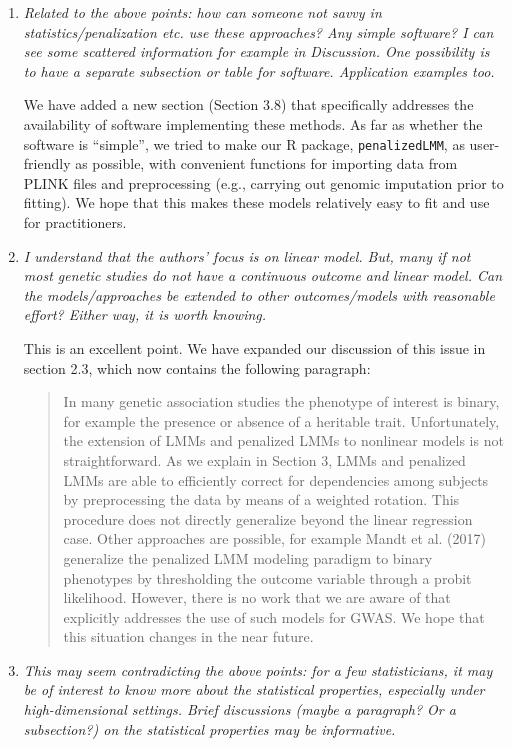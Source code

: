 \documentclass{article}
\begin{document}
\begin{enumerate}
\item \emph{Related to the above points: how can someone not savvy in statistics/penalization etc. use these approaches? Any simple software? I can see some scattered information for example in Discussion. One possibility is to have a separate subsection or table for software. Application examples too.}

  We have added a new section (Section 3.8) that specifically addresses the availability of software implementing these methods.  As far as whether the software is ``simple'', we tried to make our R package, \texttt{penalizedLMM}, as user-friendly as possible, with convenient functions for importing data from PLINK files and preprocessing (e.g., carrying out genomic imputation prior to fitting).  We hope that this makes these models relatively easy to fit and use for practitioners.

\item \emph{I understand that the authors’ focus is on linear model. But, many if not most genetic studies do not have a continuous outcome and linear model. Can the models/approaches be extended to other outcomes/models with reasonable effort? Either way, it is worth knowing.}

  This is an excellent point.  We have expanded our discussion of this issue in section 2.3, which now contains the following paragraph:

  \begin{quote}
    In many genetic association studies the phenotype of interest is binary, for example the presence or absence of a heritable trait. Unfortunately, the extension of LMMs and penalized LMMs to nonlinear models is not straightforward. As we explain in Section 3, LMMs and penalized LMMs are able to efficiently correct for dependencies among subjects by preprocessing the data by means of a weighted rotation. This procedure does not directly generalize beyond the linear regression case. Other approaches are possible, for example Mandt et al. (2017) generalize the penalized LMM modeling paradigm to binary phenotypes by thresholding the outcome variable through a probit likelihood. However, there is no work that we are aware of that explicitly addresses the use of such models for GWAS. We hope that this situation changes in the near future.
  \end{quote}

\item \emph{This may seem contradicting the above points: for a few statisticians, it may be of interest to know more about the statistical properties, especially under high-dimensional settings. Brief discussions (maybe a paragraph? Or a subsection?) on the statistical properties may be informative.}


\end{enumerate}
\end{document}
